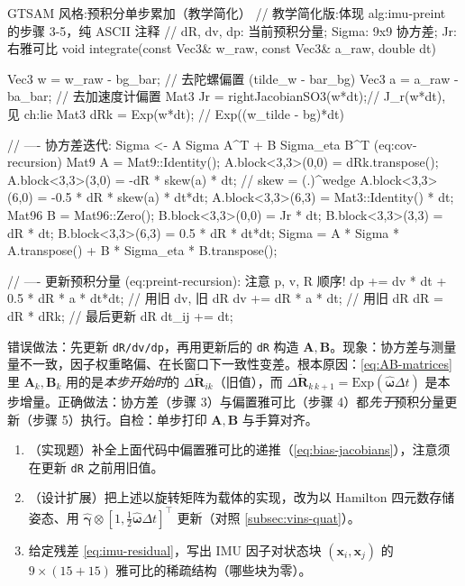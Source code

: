 \begin{codebox}[C++]{GTSAM 风格:预积分单步累加（教学简化）}
// 教学简化版:体现 alg:imu-preint 的步骤 3-5，纯 ASCII 注释
// dR, dv, dp: 当前预积分量; Sigma: 9x9 协方差; Jr: 右雅可比
void integrate(const Vec3& w_raw, const Vec3& a_raw, double dt) {
  Vec3 w = w_raw - bg_bar;          // 去陀螺偏置 (tilde_w - bar_bg)
  Vec3 a = a_raw - ba_bar;          // 去加速度计偏置
  Mat3 Jr  = rightJacobianSO3(w*dt);// J_r(w*dt), 见 ch:lie
  Mat3 dRk = Exp(w*dt);             // Exp((w_tilde - bg)*dt)

  // ---- 协方差迭代: Sigma <- A Sigma A^T + B Sigma_eta B^T (eq:cov-recursion)
  Mat9 A = Mat9::Identity();
  A.block<3,3>(0,0) = dRk.transpose();
  A.block<3,3>(3,0) = -dR * skew(a) * dt;          // skew = (.)^wedge
  A.block<3,3>(6,0) = -0.5 * dR * skew(a) * dt*dt;
  A.block<3,3>(6,3) = Mat3::Identity() * dt;
  Mat96 B = Mat96::Zero();
  B.block<3,3>(0,0) = Jr * dt;
  B.block<3,3>(3,3) = dR * dt;
  B.block<3,3>(6,3) = 0.5 * dR * dt*dt;
  Sigma = A * Sigma * A.transpose() + B * Sigma_eta * B.transpose();

  // ---- 更新预积分量 (eq:preint-recursion): 注意 p, v, R 顺序!
  dp += dv * dt + 0.5 * dR * a * dt*dt;            // 用旧 dv, 旧 dR
  dv += dR * a * dt;                               // 用旧 dR
  dR  = dR * dRk;                                  // 最后更新 dR
  dt_ij += dt;
}
\end{codebox}

\begin{pitfall}
错误做法：先更新 \texttt{dR/dv/dp}，再用更新后的 \texttt{dR} 构造 $\mathbf A,\mathbf B$。现象：协方差与测量量不一致，因子权重略偏、在长窗口下一致性变差。根本原因：\cref{eq:AB-matrices} 里 $\mathbf A_k,\mathbf B_k$ 用的是\emph{本步开始时}的 $\Delta\tilde{\mathbf R}_{ik}$（旧值），而 $\Delta\tilde{\mathbf R}_{k\,k+1}=\mathrm{Exp}(\hat{\boldsymbol\omega}\Delta t)$ 是本步增量。正确做法：协方差（步骤 3）与偏置雅可比（步骤 4）都\emph{先于}预积分量更新（步骤 5）执行。自检：单步打印 $\mathbf A,\mathbf B$ 与手算对齐。
\end{pitfall}

\begin{practice}
\begin{enumerate}
  \item （实现题）补全上面代码中偏置雅可比的递推（\cref{eq:bias-jacobians}），注意须在更新 \texttt{dR} 之前用旧值。
  \item （设计扩展）把上述以旋转矩阵为载体的实现，改为以 Hamilton 四元数存储姿态、用 $\hat{\boldsymbol\gamma}\otimes[1,\tfrac12\hat{\boldsymbol\omega}\Delta t]^\top$ 更新（对照 \cref{subsec:vins-quat}）。
  \item 给定残差 \cref{eq:imu-residual}，写出 IMU 因子对状态块 $(\mathbf x_i,\mathbf x_j)$ 的 $9\times(15{+}15)$ 雅可比的稀疏结构（哪些块为零）。
\end{enumerate}
\end{practice}

